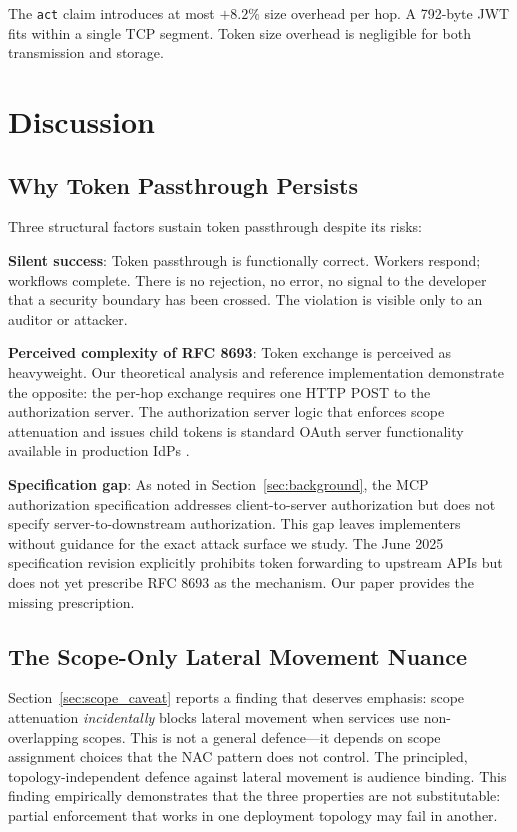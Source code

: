 \documentclass[journal]{IEEEtran}
\begin{document}
The \texttt{act} claim introduces at most $+8.2\%$ size overhead per hop.
A 792-byte JWT fits within a single TCP segment. Token size overhead is
negligible for both transmission and storage.


\section{Discussion}
\label{sec:discussion}

\subsection{Why Token Passthrough Persists}

Three structural factors sustain token passthrough despite its risks:

\textbf{Silent success}: Token passthrough is functionally correct. Workers
respond; workflows complete. There is no rejection, no error, no signal to the
developer that a security boundary has been crossed. The violation is visible only
to an auditor or attacker.

\textbf{Perceived complexity of RFC 8693}: Token exchange is perceived as
heavyweight. Our theoretical analysis and reference implementation demonstrate
the opposite: the per-hop exchange requires one HTTP POST to the authorization
server. The authorization server logic that enforces scope attenuation and
issues child tokens is standard OAuth server functionality available in
production IdPs \cite{rfc8693_deploy}.

\textbf{Specification gap}: As noted in Section~\ref{sec:background}, the MCP
authorization specification \cite{mcp_spec_2025} addresses client-to-server
authorization but does not specify server-to-downstream authorization. This gap
leaves implementers without guidance for the exact attack surface we study.
The June 2025 specification revision \cite{mcp_spec_2025} explicitly prohibits
token forwarding to upstream APIs but does not yet prescribe RFC 8693 as the
mechanism. Our paper provides the missing prescription.

\subsection{The Scope-Only Lateral Movement Nuance}

Section~\ref{sec:scope_caveat} reports a finding that deserves emphasis: scope
attenuation \textit{incidentally} blocks lateral movement when services use
non-overlapping scopes. This is not a general defence---it depends on scope
assignment choices that the NAC pattern does not control. The principled,
topology-independent defence against lateral movement is audience binding. This
finding empirically demonstrates that the three properties are not substitutable:
partial enforcement that works in one deployment topology may fail in another.
\end{document}
